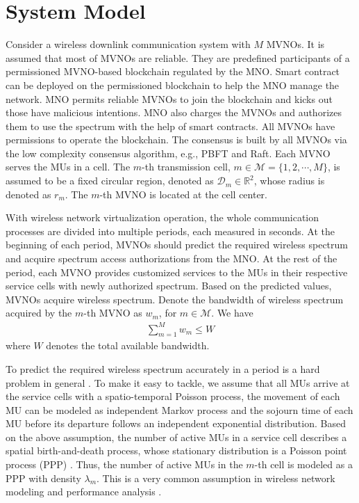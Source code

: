 \documentclass[journal]{IEEEtran}
\begin{document}
\section{System Model}

Consider a wireless downlink communication system with $M$ MVNOs. {\color{red}
It is assumed that most of MVNOs are reliable. They are predefined participants of a permissioned MVNO-based blockchain regulated by the MNO. Smart contract can be deployed on the permissioned blockchain to help the MNO manage the network. MNO permits reliable MVNOs to join the blockchain and kicks out those have malicious intentions. MNO also charges the MVNOs and authorizes them to use the spectrum with the help of smart contracts. All MVNOs have permissions to operate the blockchain. The consensus is built by all MVNOs via the low complexity consensus algorithm, e.g., PBFT and Raft.} Each MVNO serves the MUs in a cell. The $m$-th transmission cell, $m\in\mathcal{M}=\{1,2,\cdots,M\}$, is assumed to be a fixed circular region, denoted as  $\mathcal{D}_m\in \mathbb{R}^2$, whose radius is denoted as $r_m$. The $m$-th MVNO is located at the cell center.

With wireless network virtualization operation, the whole communication processes are divided into multiple periods, each measured in {\color{red}seconds}. At the beginning of each period, MVNOs should predict the required wireless spectrum and acquire spectrum access authorizations from the MNO. At the rest of the period, each MVNO provides customized services to the MUs in their respective service cells with newly authorized spectrum. Based on the predicted values, MVNOs acquire wireless spectrum. Denote the bandwidth of wireless spectrum acquired by the $m$-th MVNO as $w_m$, for $m\in\mathcal{M}$. We have
\begin{align}
	\label{q1}
\sum_{m=1}^{M} w_m \leq W
\end{align}
where $W$ denotes the total available bandwidth.

{\color{red} To predict the required wireless spectrum accurately in a period is a hard problem in general \cite{XXing,Nguyen}. To make it easy to tackle, we assume that all MUs arrive at the service cells with a spatio-temporal Poisson process, the movement of each MU can be modeled as independent Markov process and the sojourn time of each MU before its departure follows an independent exponential distribution. Based on the above assumption, the number of active MUs in a service cell describes a spatial birth-and-death process, whose stationary distribution is a Poisson point process (PPP) \cite{FBaccelli,RSerfozo}. Thus, the number of active MUs in the $m$-th cell is modeled as a PPP with density $\lambda_m$. This is a very common assumption in wireless network modeling and performance analysis \cite{JGAndrews, HSDhillon}.
}
\end{document}
